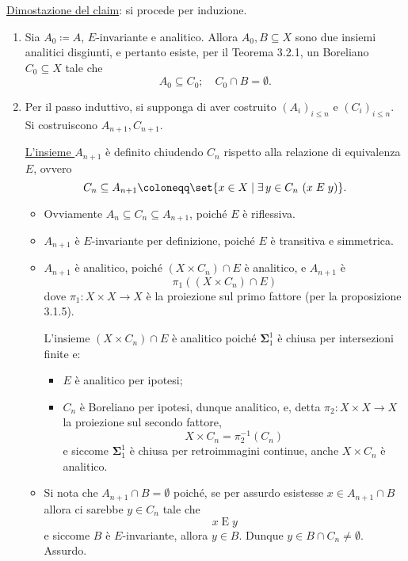 \documentclass{article}
\newcommand{\1}{\mathds{1}}
\begin{document}
\uline{Dimostazione del claim}: si procede per induzione.

\begin{enumerate}
\item Sia \(A_{0}\coloneqq A\), \(E\)-invariante e analitico. Allora \(A_{0}, B \subseteq X\) sono due insiemi analitici disgiunti, e pertanto esiste, per il Teorema 3.2.1, un Boreliano \(C_{0} \subseteq X\) tale che
\begin{equation*}
 A_{0} \subseteq C_{0};\quad C_{0}\cap B = \emptyset.
\end{equation*}

\item Per il passo induttivo, si supponga di aver costruito \((A_{i})_{i\le n}\) e \((C_{i})_{i\le n}\). Si costruiscono \(A_{n+1}, C_{n+1}\).

\uline{L'insieme \(A_{n+1}\)} è definito chiudendo \(C_{n}\) rispetto alla relazione di equivalenza \(E\), ovvero
\begin{equation*}
 C_{n} \subseteq A_{n+1} \coloneqq \set{x \in X\mid \exists\,y \in C_{n}\ (x\mathrel{E}y)}.
\end{equation*}
\begin{itemize}
\item Ovviamente \(A_{n} \subseteq C_{n} \subseteq A_{n+1}\), poiché \(E\) è riflessiva.
\item \(A_{n+1}\) è \(E\)-invariante per definizione, poiché \(E\) è transitiva e simmetrica.
\item \(A_{n+1}\) è analitico, poiché \((X\times C_{n})\cap E\) è analitico, e \(A_{n+1}\) è
\begin{equation*}
   \pi_{1}\left((X\times C_{n})\cap E\right)
\end{equation*}
dove \(\pi_{1}:X\times X\to X\) è la proiezione sul primo fattore (per la proposizione 3.1.5).

L'insieme \((X\times C_{n})\cap E\) è analitico
poiché \(\bm{\Sigma}_{1}^{1}\) è chiusa per intersezioni finite e:
\begin{itemize}
\item \(E\) è analitico per ipotesi;
\item \(C_{n}\) è Boreliano per ipotesi, dunque analitico, e, detta \(\pi_{2}: X\times X\to X\) la proiezione sul secondo fattore,
\begin{equation*}
 X\times C_{n}= \pi_{2}^{-1}(C_{n})
\end{equation*}
e siccome \(\bm{\Sigma}_{1}^{1}\) è chiusa per retroimmagini continue, anche \(X\times C_{n}\) è analitico.
\end{itemize}
\item Si nota che \(A_{n+1}\cap B=\emptyset\) poiché, se per assurdo esistesse \(x \in A_{n+1}\cap B\) allora ci sarebbe \(y \in C_{n}\) tale che
\begin{equation*}
   x\mathrel{E}y
\end{equation*}
e siccome \(B\) è \(E\)-invariante, allora \(y \in B\). Dunque \(y \in B\cap C_{n} \neq\emptyset\). Assurdo.
\end{itemize}


\end{enumerate}
\end{document}
